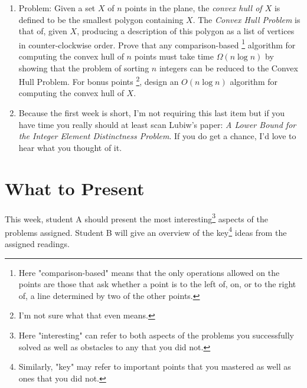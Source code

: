 \documentclass[11pt]{article}
\begin{document}
\begin{enumerate}
\item Problem: Given a set $X$ of $n$ points in the plane, the {\em convex hull of $X$} is defined to be the
smallest polygon containing $X$.  The {\em Convex Hull Problem} is that of, given $X$, producing a description of
this polygon as a list of vertices in counter-clockwise order.
Prove that any comparison-based
\footnote{Here "comparison-based" means that the only operations allowed on the points are those that ask
whether a point is to the left of, on, or to the right of, a line determined by two of the other points.}
algorithm for computing the convex hull
of $n$ points must take time $\Omega(n \log n)$ by showing that the problem of sorting $n$ integers
can be reduced to the Convex Hull Problem.  For bonus points
\footnote{I'm not sure what that even means.}, design an $O(n \log n)$ algorithm for computing the
convex hull of $X$.
\item Because the first week is short, I'm not requiring this last item but if you have time you really should at least
scan Lubiw's paper: {\em A Lower Bound for the Integer Element Distinctness Problem}. If you do get a chance,
I'd love to hear what you thought of it.
\end{enumerate}

\section{What to Present}
This week, student A should present the most interesting\footnote{Here "interesting" can refer to both aspects of the problems you successfully solved as well as obstacles
to any that you did not.}
aspects of the problems assigned.
Student B will give an overview of the key\footnote{Similarly, "key" may refer to important points that you mastered
as well as ones that you did not.}
ideas from the assigned readings.
\end{document}
